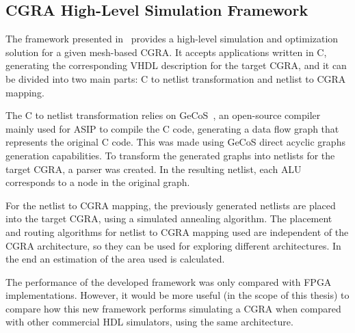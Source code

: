 \subsection{CGRA High-Level Simulation Framework}
\label{subsection:framework}

The framework presented in~\cite{pasha:CGRA} provides a high-level simulation
and optimization solution for a given mesh-based \ac{CGRA}. It accepts applications
written in C, generating the corresponding VHDL description for the target \ac{CGRA},
and it can be divided into two main parts: C to netlist transformation and
netlist to \ac{CGRA} mapping.

The C to netlist transformation relies on GeCoS~\cite{l'hours:FPGA}, an
open-source compiler mainly used for \ac{ASIP} to compile the C code, generating a data 
flow graph that represents the original C code. This was made using GeCoS direct acyclic 
graphs generation capabilities. To transform the generated graphs into netlists for the 
target \ac{CGRA}, a parser was created. In the resulting netlist, each \ac{ALU} 
corresponds to a node in the original graph.

For the netlist to \ac{CGRA} mapping, the previously generated netlists are placed
into the target \ac{CGRA}, using a simulated annealing algorithm. The placement and
routing algorithms for netlist to CGRA mapping used are independent of the \ac{CGRA}
architecture, so they can be used for exploring different architectures. In the
end an estimation of the area used is calculated.

The performance of the developed framework was only compared with \ac{FPGA}
implementations. However, it would be more useful (in the scope of this thesis)
to compare how this new framework performs simulating a \ac{CGRA} when compared with
other commercial \ac{HDL} simulators, using the same architecture.
